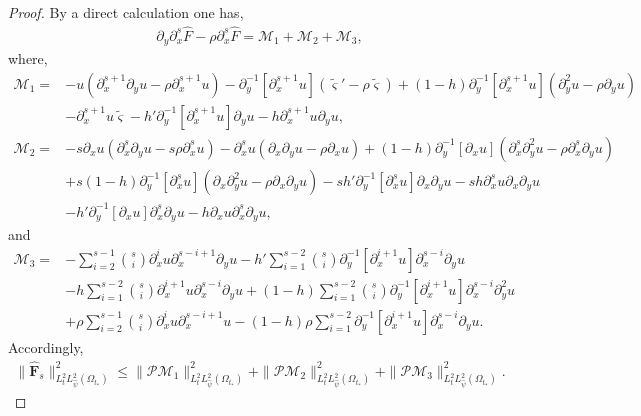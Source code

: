 \documentclass{amsart}
\numberwithin{equation}{section}
\begin{document}
\begin{proof}
By a direct calculation one has,
\begin{align*}
 \partial_{y}\partial_{x}^{s}\hat{F}-\rho\partial_{x}^{s}\hat{F}
=\mathcal{M}_{1}+\mathcal{M}_{2}+\mathcal{M}_{3},
\end{align*}
where,
\begin{align*}
\mathcal{M}_{1}
=&-u(\partial_{x}^{s+1}\partial_{y}u-\rho\partial_{x}^{s+1}u)
  -\partial_{y}^{-1}[\partial_{x}^{s+1}u](\tilde{\varsigma}'-\rho\tilde{\varsigma})
  +(1-h)\partial_{y}^{-1}[\partial_{x}^{s+1}u](\partial_{y}^{2}u-\rho\partial_{y}u)\\
 &-\partial_{x}^{s+1}u\tilde{\varsigma}
  -h'\partial_{y}^{-1}[\partial_{x}^{s+1}u]\partial_{y}u
  -h\partial_{x}^{s+1}u\partial_{y}u,
\end{align*}
\begin{align*}
\mathcal{M}_{2}
=&-s\partial_{x}u(\partial_{x}^{s}\partial_{y}u-s\rho\partial_{x}^{s}u)
  -\partial_{x}^{s}u(\partial_{x}\partial_{y}u-\rho\partial_{x}u)
  +(1-h)\partial_{y}^{-1}[\partial_{x}u](\partial_{x}^{s}\partial_{y}^{2}u-\rho\partial_{x}^{s}\partial_{y}u)\\
 &+s(1-h)\partial_{y}^{-1}[\partial_{x}^{s}u](\partial_{x}\partial_{y}^{2}u-\rho\partial_{x}\partial_{y}u)
  -sh'\partial_{y}^{-1}[\partial_{x}^{s}u]\partial_{x}\partial_{y}u
  -sh\partial_{x}^{s}u\partial_{x}\partial_{y}u\\
 &-h'\partial_{y}^{-1}[\partial_{x}u]\partial_{x}^{s}\partial_{y}u
  -h\partial_{x}u\partial_{x}^{s}\partial_{y}u,
\end{align*}
and
\begin{align*}
\mathcal{M}_{3}
=&-\sum_{i=2}^{s-1}\binom{s}{i}\partial_{x}^{i}u\partial_{x}^{s-i+1}\partial_{y}u
  -h'\sum_{i=1}^{s-2}\binom{s}{i}\partial_{y}^{-1}[\partial_{x}^{i+1}u]\partial_{x}^{s-i}\partial_{y}u\\
 &-h\sum_{i=1}^{s-2}\binom{s}{i}\partial_{x}^{i+1}u\partial_{x}^{s-i}\partial_{y}u
  +(1-h)\sum_{i=1}^{s-2}\binom{s}{i}\partial_{y}^{-1}[\partial_{x}^{i+1}u]\partial_{x}^{s-i}\partial_{y}^{2}u\\
 &+\rho \sum_{i=2}^{s-1}\binom{s}{i}\partial_{x}^{i}u\partial_{x}^{s-i+1}u
  -(1-h)\rho\sum_{i=1}^{s-2}\partial_{y}^{-1}[\partial_{x}^{i+1}u]\partial_{x}^{s-i}\partial_{y}u.
\end{align*}
Accordingly,
\begin{align}\label{Fs}
\|\hat{\mathbf{F}}_{s}\|_{L_{t}^{2}L_{\hat{\psi}}^{2}(\Omega_{t_{*}})}^{2}
\leq \|\mathcal{P}\mathcal{M}_{1}\|_{L_{t}^{2}L_{\hat{\psi}}^{2}(\Omega_{t_{*}})}^{2}
    +\|\mathcal{P}\mathcal{M}_{2}\|_{L_{t}^{2}L_{\hat{\psi}}^{2}(\Omega_{t_{*}})}^{2}
    +\|\mathcal{P}\mathcal{M}_{3}\|_{L_{t}^{2}L_{\hat{\psi}}^{2}(\Omega_{t_{*}})}^{2}.
\end{align}


\end{proof}
\end{document}

